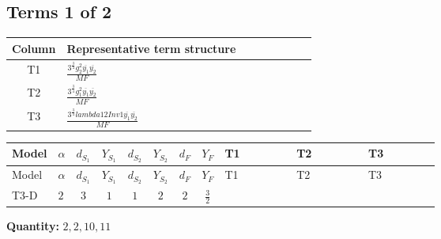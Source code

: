 \documentclass[8pt]{article}
\begin{document}
\begin{landscape}
\subsection*{Terms 1 of 2}
\begin{center}
\begin{tabular}{@{}c >{\raggedright\arraybackslash}p{0.82\linewidth}@{}}
\toprule
Column & Representative term structure \\
\midrule
T1 & \(\displaystyle \frac{3^{\frac{3}{4}} g_{2}^{2} \overline{y_{1}} \overline{y_{2}}}{MF}\) \\
\midrule
T2 & \(\displaystyle \frac{3^{\frac{3}{4}} g_{1}^{2} \overline{y_{1}} \overline{y_{2}}}{MF}\) \\
\midrule
T3 & \(\displaystyle \frac{3^{\frac{3}{4}} lambda12Inv1 \overline{y_{1}} \overline{y_{2}}}{MF}\) \\
\midrule
\bottomrule
\end{tabular}
\end{center}
\smallskip
\tiny
\begin{longtable}{@{}llcccccc >{\raggedright\arraybackslash}p{0.21\linewidth} >{\raggedright\arraybackslash}p{0.21\linewidth} >{\raggedright\arraybackslash}p{0.21\linewidth}@{}}
\toprule
Model & $\alpha$ & $d_{S_1}$ & $Y_{S_1}$ & $d_{S_2}$ & $Y_{S_2}$ & $d_F$ & $Y_F$ & T1 & T2 & T3 \\
\midrule
\endfirsthead
\toprule
Model & $\alpha$ & $d_{S_1}$ & $Y_{S_1}$ & $d_{S_2}$ & $Y_{S_2}$ & $d_F$ & $Y_F$ & T1 & T2 & T3 \\
\midrule
\endhead
T3-D & $2$ & $3$ & $1$ & $1$ & $2$ & $2$ & $\frac{3}{2}$ & \scriptsize\adjustbox{max width=\linewidth}{$\begin{gathered} - \frac{17 \cdot 3^{\frac{3}{4}} g_{2}^{2} \overline{y_{1}} \overline{y_{2}}}{24 MF}\end{gathered}$} & \scriptsize\adjustbox{max width=\linewidth}{$\begin{gathered} - \frac{9 \cdot 3^{\frac{3}{4}} g_{1}^{2} \overline{y_{1}} \overline{y_{2}}}{8 MF}\end{gathered}$} & \scriptsize\adjustbox{max width=\linewidth}{$\begin{gathered} - \frac{3^{\frac{3}{4}} lambda12Inv1 \overline{y_{1}} \overline{y_{2}}}{6 MF}\end{gathered}$} \\
\midrule
\bottomrule
\end{longtable}
\clearpage
\noindent\textbf{Quantity: }$\mathrm{2,2,10,11}$\par\smallskip

\end{landscape}
\end{document}
